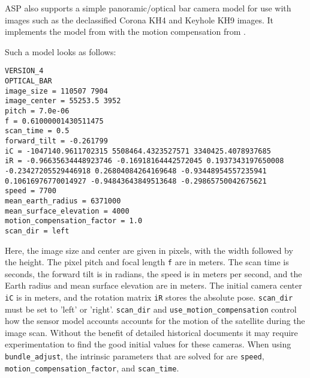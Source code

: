 ASP also supports a simple panoramic/optical bar camera model for use with images such as
the declassified Corona KH4 and Keyhole KH9 images. It implements the model
from \cite{schenk2003rigorous} with the motion compensation from \cite{sohn2004mathematical}.

Such a model looks as follows:
\begin{verbatim}
VERSION_4
OPTICAL_BAR
image_size = 110507 7904
image_center = 55253.5 3952
pitch = 7.0e-06
f = 0.61000001430511475
scan_time = 0.5
forward_tilt = -0.261799
iC = -1047140.9611702315 5508464.4323527571 3340425.4078937685
iR = -0.96635634448923746 -0.16918164442572045 0.1937343197650008 -0.23427205529446918 0.26804084264169648 -0.93448954557235941 0.10616976770014927 -0.94843643849513648 -0.29865750042675621
speed = 7700
mean_earth_radius = 6371000
mean_surface_elevation = 4000
motion_compensation_factor = 1.0
scan_dir = left
\end{verbatim}

Here, the image size and center are given in pixels, with the width followed by the
height. The pixel pitch and focal length \texttt{f} are in meters. The
scan time is seconds, the forward tilt is in radians,
the speed is in meters per second, and the Earth radius and mean
surface elevation are in meters. The initial camera center \texttt{iC} is 
in meters, and the rotation matrix \texttt{iR} stores the absolute pose.
\texttt{scan\_dir} must be set to 'left' or 'right'.
\texttt{scan\_dir} and \texttt{use\_motion\_compensation}
control how the sensor model accounts accounts for the motion of the satellite
during the image scan.  Without the benefit of detailed historical documents it may
require experimentation to find the good initial values for these cameras.  When using
\texttt{bundle\_adjust}, the intrinsic parameters that are solved for are 
\texttt{speed}, \texttt{motion\_compensation\_factor}, and \texttt{scan\_time}.
